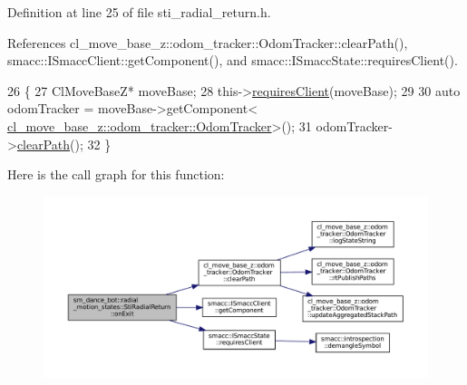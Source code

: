 Definition at line 25 of file sti\+\_\+radial\+\_\+return.\+h.



References cl\+\_\+move\+\_\+base\+\_\+z\+::odom\+\_\+tracker\+::\+Odom\+Tracker\+::clear\+Path(), smacc\+::\+I\+Smacc\+Client\+::get\+Component(), and smacc\+::\+I\+Smacc\+State\+::requires\+Client().


\begin{DoxyCode}
26   \{
27       ClMoveBaseZ* moveBase;
28       this->\hyperlink{classsmacc_1_1ISmaccState_a7f95c9f0a6ea2d6f18d1aec0519de4ac}{requiresClient}(moveBase);
29 
30       \textcolor{keyword}{auto} odomTracker = moveBase->getComponent<
      \hyperlink{classcl__move__base__z_1_1odom__tracker_1_1OdomTracker}{cl\_move\_base\_z::odom\_tracker::OdomTracker}>();
31       odomTracker->\hyperlink{classcl__move__base__z_1_1odom__tracker_1_1OdomTracker_a93a14e15e3e623f530e056f403bf7644}{clearPath}();
32   \}
\end{DoxyCode}
Here is the call graph for this function\+:
\nopagebreak
\begin{figure}[H]
\begin{center}
\leavevmode
\includegraphics[width=350pt]{structsm__dance__bot_1_1radial__motion__states_1_1StiRadialReturn_ab023b2869f4cdb182fd43bb81bc6dfd0_cgraph}
\end{center}
\end{figure}
\mbox{\label{structsm__dance__bot_1_1radial__motion__states_1_1StiRadialReturn_aa657a5b660ec8ee8e8f100c52d63551d}} 
